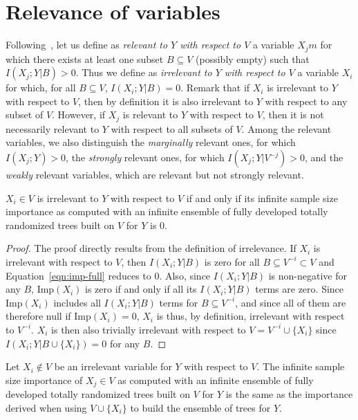 \section{Relevance of variables}
\label{sec:6:variable-relevance}

Following~\citet{kohavi:1997}, let us define as {\em relevant to $Y$ with
respect to $V$} a variable $X_jm$ for which there exists at least one subset $B
\subseteq V$ (possibly empty) such that $I(X_j;Y|B)>0$. Thus we define as {\em
irrelevant to $Y$ with respect to $V$} a variable $X_i$ for which, for all $B
\subseteq V$, $I(X_i; Y|B)=0$. Remark that if $X_i$ is irrelevant to $Y$ with
respect to $V$, then by definition it is also irrelevant to $Y$ with respect to
any subset of $V$. However, if $X_j$ is relevant to $Y$ with respect to $V$,
then it is not necessarily relevant to $Y$ with respect to all  subsets of $V$.
Among the relevant variables, we also distinguish the {\em marginally} relevant
ones, for which $I(X_{j}; Y) > 0$, the  {\em strongly} relevant ones, for which
$I(X_{j}; Y | V^{-j}) > 0$,  and the {\em weakly} relevant variables, which are
relevant but not strongly relevant.

\begin{theorem}\label{thm:irrelevant}
  $X_i \in V$ is irrelevant to $Y$ with respect to $V$ if and only if  its
  infinite sample size importance as computed with an infinite ensemble of fully
  developed totally randomized trees built on $V$ for $Y$ is 0.
\end{theorem}

\begin{proof}
The proof directly results from the definition of irrelevance. If $X_i$ is
irrelevant with respect to $V$, then $I(X_i;Y|B)$ is zero for all $B \subseteq
V^{-i} \subset V$ and Equation~\ref{eqn:imp-full} reduces to $0$. Also, since
$I(X_i;Y|B)$ is non-negative for any $B$, $\text{Imp}(X_i)$ is zero if and only if all
its $I(X_i;Y|B)$ terms are zero. Since $\text{Imp}(X_i)$ includes all $I(X_i;Y|B)$
terms for $B \subseteq V^{-i}$, and since all of them are therefore null if
$\text{Imp}(X_i)=0$,  $X_i$ is thus, by definition, irrelevant with respect to
$V^{-i}$. $X_i$ is then also trivially irrelevant with respect to $V=V^{-i} \cup
\{X_i\}$ since $I(X_i;Y|B\cup\{X_i\})=0$ for any $B$.
\end{proof}

\begin{lemma}\label{lemma:adding-irrelevant}
  Let $X_i \notin V$ be an irrelevant variable for $Y$ with respect to $V$. The infinite
  sample size importance of $X_j \in V$ as computed with an infinite
  ensemble of fully developed totally randomized trees built on $V$ for $Y$ is the
  same as the importance derived when using $V\cup \{X_i\}$ to build the ensemble of trees for $Y$.
\end{lemma}

